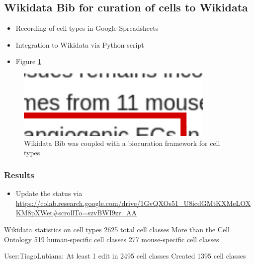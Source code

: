 \hypertarget{wikidata-bib-for-curation-of-cells-to-wikidata}{%
\subsection{Wikidata Bib for curation of cells to Wikidata}\label{wikidata-bib-for-curation-of-cells-to-wikidata}}

\begin{itemize}
\item
  Recording of cell types in Google Spreadsheets
\item
  Integration to Wikidata via Python script
\item
  Figure \ref{fig:biocuration_of_cells}
\end{itemize}

\begin{figure}
\hypertarget{fig:biocuration_of_cells}{%
\centering
\includegraphics[width=0.85\textwidth,height=\textheight]{images/biocuration_of_cells.png}
\caption{Wikidata Bib was coupled with a biocuration framework for cell types}\label{fig:biocuration_of_cells}
}
\end{figure}

\hypertarget{results-1}{%
\subsubsection{Results}\label{results-1}}

\begin{itemize}
\tightlist
\item
  Update the status via \url{https://colab.research.google.com/drive/1GvQXOs51_U8icdGMtKXMeLOXKM8pXWet\#scrollTo=szvBWI9zr_AA}
\end{itemize}

Wikidata statistics on cell types
2625 total cell classes
More than the Cell Ontology
519 human-specific cell classes
277 mouse-specific cell classes

User:TiagoLubiana:
At least 1 edit in 2495 cell classes
Created 1395 cell classes

